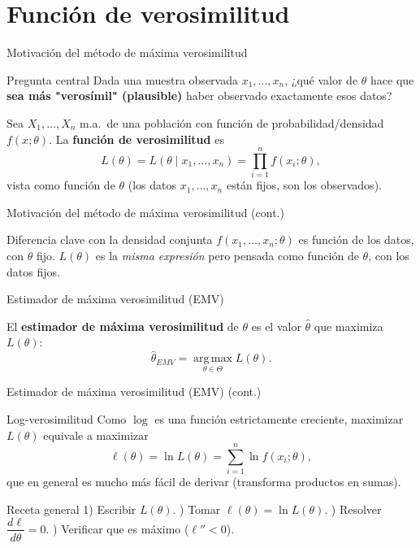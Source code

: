 \documentclass[aspectratio=169,11pt]{beamer}
\begin{document}
\section{Función de verosimilitud}

\begin{frame}{Motivación del método de máxima verosimilitud}
\begin{block}{Pregunta central}
Dada una muestra observada $x_1,\dots,x_n$, ¿qué valor de $\theta$ hace que \textbf{sea más "verosímil" (plausible)} haber observado exactamente esos datos?
\end{block}

\begin{definition}
Sea $X_1,\dots,X_n$ m.a.\ de una población con función de probabilidad/densidad $f(x;\theta)$. La \textbf{función de verosimilitud} es
\[
L(\theta) = L(\theta \mid x_1,\dots,x_n) = \prod_{i=1}^n f(x_i;\theta),
\]
vista como función de $\theta$ (los datos $x_1,\dots,x_n$ están fijos, son los observados).
\end{definition}

\end{frame}

\begin{frame}{Motivación del método de máxima verosimilitud (cont.)}
\begin{alertblock}{Diferencia clave con la densidad conjunta}
$f(x_1,\dots,x_n;\theta)$ es función de los datos, con $\theta$ fijo. $L(\theta)$ es la \emph{misma expresión} pero pensada como función de $\theta$, con los datos fijos.
\end{alertblock}
\end{frame}

\begin{frame}{Estimador de máxima verosimilitud (EMV)}
\begin{definition}[EMV]
El \textbf{estimador de máxima verosimilitud} de $\theta$ es el valor $\widehat\theta$ que maximiza $L(\theta)$:
\[
\widehat\theta_{EMV} = \operatorname*{arg\,max}_{\theta \in \Theta} L(\theta).
\]
\end{definition}

\end{frame}

\begin{frame}{Estimador de máxima verosimilitud (EMV) (cont.)}
\begin{block}{Log-verosimilitud}
Como $\log$ es una función estrictamente creciente, maximizar $L(\theta)$ equivale a maximizar
\[
\ell(\theta) = \ln L(\theta) = \sum_{i=1}^n \ln f(x_i;\theta),
\]
que en general es mucho más fácil de derivar (transforma productos en sumas).
\end{block}

\begin{alertblock}{Receta general}
1) Escribir $L(\theta)$. ) Tomar $\ell(\theta)=\ln L(\theta)$. ) Resolver $\dfrac{d\ell}{d\theta}=0$. ) Verificar que es máximo ($\ell''<0$).
\end{alertblock}
\end{frame}
\end{document}
